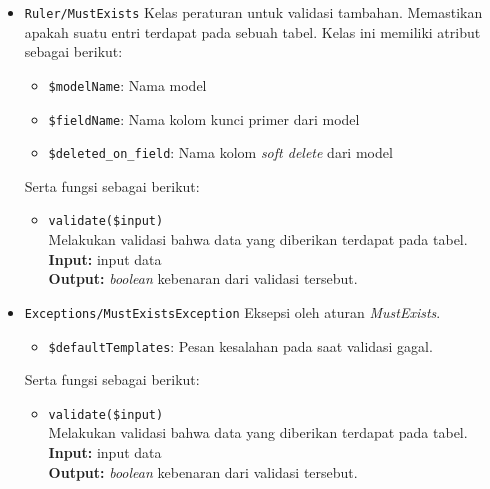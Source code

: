 \begin{itemize}
        \item \texttt{Ruler/MustExists}
            Kelas peraturan untuk validasi tambahan. Memastikan apakah suatu entri terdapat
            pada sebuah tabel. Kelas ini memiliki atribut sebagai berikut:
            \begin{itemize}
                \item \texttt{\$modelName}: Nama model
                \item \texttt{\$fieldName}: Nama kolom kunci primer dari model
                \item \texttt{\$deleted\_on\_field}: Nama kolom \textit{soft delete} dari model
            \end{itemize}
            Serta fungsi sebagai berikut:
            \begin{itemize}
                \item \texttt{validate(\$input)} \\
                    Melakukan validasi bahwa data yang diberikan terdapat pada tabel.\\
                    \textbf{Input:} input data\\
                    \textbf{Output:} \textit{boolean} kebenaran dari validasi tersebut.
            \end{itemize}
            
        \item \texttt{Exceptions/MustExistsException}
            Eksepsi oleh aturan \textit{MustExists}.
            \begin{itemize}
                \item \texttt{\$defaultTemplates}: Pesan kesalahan pada saat validasi gagal.
            \end{itemize}
            Serta fungsi sebagai berikut:
            \begin{itemize}
                \item \texttt{validate(\$input)} \\
                    Melakukan validasi bahwa data yang diberikan terdapat pada tabel.\\
                    \textbf{Input:} input data\\
                    \textbf{Output:} \textit{boolean} kebenaran dari validasi tersebut.
            \end{itemize}
    \end{itemize}

